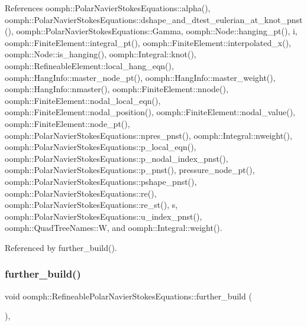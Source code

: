 References oomph\+::\+Polar\+Navier\+Stokes\+Equations\+::alpha(), oomph\+::\+Polar\+Navier\+Stokes\+Equations\+::dshape\+\_\+and\+\_\+dtest\+\_\+eulerian\+\_\+at\+\_\+knot\+\_\+pnst(), oomph\+::\+Polar\+Navier\+Stokes\+Equations\+::\+Gamma, oomph\+::\+Node\+::hanging\+\_\+pt(), i, oomph\+::\+Finite\+Element\+::integral\+\_\+pt(), oomph\+::\+Finite\+Element\+::interpolated\+\_\+x(), oomph\+::\+Node\+::is\+\_\+hanging(), oomph\+::\+Integral\+::knot(), oomph\+::\+Refineable\+Element\+::local\+\_\+hang\+\_\+eqn(), oomph\+::\+Hang\+Info\+::master\+\_\+node\+\_\+pt(), oomph\+::\+Hang\+Info\+::master\+\_\+weight(), oomph\+::\+Hang\+Info\+::nmaster(), oomph\+::\+Finite\+Element\+::nnode(), oomph\+::\+Finite\+Element\+::nodal\+\_\+local\+\_\+eqn(), oomph\+::\+Finite\+Element\+::nodal\+\_\+position(), oomph\+::\+Finite\+Element\+::nodal\+\_\+value(), oomph\+::\+Finite\+Element\+::node\+\_\+pt(), oomph\+::\+Polar\+Navier\+Stokes\+Equations\+::npres\+\_\+pnst(), oomph\+::\+Integral\+::nweight(), oomph\+::\+Polar\+Navier\+Stokes\+Equations\+::p\+\_\+local\+\_\+eqn(), oomph\+::\+Polar\+Navier\+Stokes\+Equations\+::p\+\_\+nodal\+\_\+index\+\_\+pnst(), oomph\+::\+Polar\+Navier\+Stokes\+Equations\+::p\+\_\+pnst(), pressure\+\_\+node\+\_\+pt(), oomph\+::\+Polar\+Navier\+Stokes\+Equations\+::pshape\+\_\+pnst(), oomph\+::\+Polar\+Navier\+Stokes\+Equations\+::re(), oomph\+::\+Polar\+Navier\+Stokes\+Equations\+::re\+\_\+st(), s, oomph\+::\+Polar\+Navier\+Stokes\+Equations\+::u\+\_\+index\+\_\+pnst(), oomph\+::\+Quad\+Tree\+Names\+::W, and oomph\+::\+Integral\+::weight().



Referenced by further\+\_\+build().

\mbox{\label{classoomph_1_1RefineablePolarNavierStokesEquations_ac75e1f0ff50368bd056a8d39c917e35b}} 
\subsubsection{\texorpdfstring{further\+\_\+build()}{further\_build()}}
{\footnotesize\ttfamily void oomph\+::\+Refineable\+Polar\+Navier\+Stokes\+Equations\+::further\+\_\+build (\begin{DoxyParamCaption}{ }\end{DoxyParamCaption})\hspace{0.3cm}{\ttfamily [inline]}, {\ttfamily [virtual]}}



